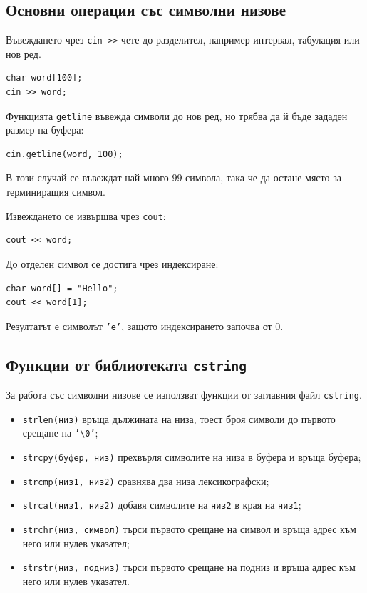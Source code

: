 \subsection{Основни операции със символни низове}\label{s:14.7.1}

Въвеждането чрез \texttt{cin >>} чете до разделител, например интервал, табулация или нов ред.

\begin{verbatim}
char word[100];
cin >> word;
\end{verbatim}

Функцията \texttt{getline} въвежда символи до нов ред, но трябва да й бъде зададен размер на буфера:

\begin{verbatim}
cin.getline(word, 100);
\end{verbatim}

В този случай се въвеждат най-много $99$ символа, така че да остане място за терминиращия символ.

Извеждането се извършва чрез \texttt{cout}:

\begin{verbatim}
cout << word;
\end{verbatim}

До отделен символ се достига чрез индексиране:

\begin{verbatim}
char word[] = "Hello";
cout << word[1];
\end{verbatim}

Резултатът е символът \texttt{'e'}, защото индексирането започва от $0$.

\subsection{Функции от библиотеката \texttt{cstring}}\label{s:14.7.2}

За работа със символни низове се използват функции от заглавния файл \texttt{cstring}.

\begin{itemize}
\item \texttt{strlen(низ)} връща дължината на низа, тоест броя символи до първото срещане на \texttt{'\textbackslash 0'};
\item \texttt{strcpy(буфер, низ)} прехвърля символите на низа в буфера и връща буфера;
\item \texttt{strcmp(низ1, низ2)} сравнява два низа лексикографски;
\item \texttt{strcat(низ1, низ2)} добавя символите на \texttt{низ2} в края на \texttt{низ1};
\item \texttt{strchr(низ, символ)} търси първото срещане на символ и връща адрес към него или нулев указател;
\item \texttt{strstr(низ, подниз)} търси първото срещане на подниз и връща адрес към него или нулев указател.
\end{itemize}

